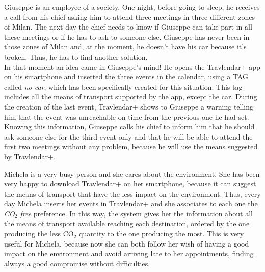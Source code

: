 
Giuseppe is an employee of a society. One night, before going to sleep, he receives a call from his chief asking him to attend three meetings in three different zones of Milan. The next day the chief needs to know if Giuseppe can take part in all these meetings or if he has to ask to someone else. Giuseppe has never been in those zones of Milan and, at the moment, he doesn’t have his car because it’s broken. Thus, he has to find another solution.\\
In that moment an idea came in Giuseppe’s mind! He opens the Travlendar+ app on his smartphone and inserted the three events in the calendar, using a TAG called \emph{no car}, which has been specifically created for this situation. This tag includes all the means of transport supported by the app, except the car. During the creation of the last event, Travlendar+ shows to Giuseppe a warning telling him that the event was unreachable on time from the previous one he had set. Knowing this information, Giuseppe calls his chief to inform him that he should ask someone else for the third event only and that he will be able to attend the first two meetings without any problem, because he will use the means suggested by Travlendar+.

Michela is a very busy person and she cares about the environment. She has been very happy to download Travlendar+ on her smartphone, because it can suggest the means of transport that have the less impact on the environment. Thus, every day Michela inserts her events in Travlendar+ and she associates to each one the \emph{CO$_2$ free} preference. In this way, the system gives her the information about all the means of transport available reaching each destination, ordered by the one producing the less CO$_2$ quantity to the one producing the most. This is very useful for Michela, because now she can both follow her wish of having a good impact on the environment and avoid arriving late to her appointments, finding always a good compromise without difficulties.

